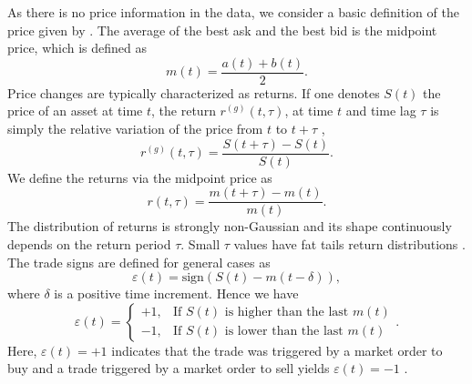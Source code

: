 As there is no price information in the data, we consider a basic definition of
the price given by \cite{forex_liquidity,patterns_forex,political_forex}. The
average of the best ask and the best bid is the midpoint price, which is
defined as
\cite{teach_spread,subtle_nature,Bouchaud_2004,my_paper_response_financial,large_prices_changes,prop_order_book,stat_theory,em_stylized_facts}
\begin{equation}
    m \left(t\right) = \frac{a\left(t\right) + b\left(t\right)}{2}.
\end{equation}
Price changes are typically characterized as returns. If one denotes
$S\left( t\right)$ the price of an asset at time $t$, the return
$r^{\left(g\right)}\left(t, \tau\right)$, at time $t$ and time lag $\tau$ is
simply the relative variation of the price from $t$ to $t + \tau$
\cite{subtle_nature,empirical_facts,asynchrony_effects_corr,tick_size_impact,causes_epps_effect,non_stationarity},
\begin{equation}\label{eq:return_general}
    r^{\left(g\right)} \left(t, \tau \right) = \frac{S\left(t + \tau\right)
    - S\left(t\right)}{S\left(t\right)}.
\end{equation}
We define the returns via the midpoint price as
\begin{equation}\label{eq:midpoint_price_return}
    r\left(t,\tau\right) = \frac{m\left(t+\tau\right)-m\left(t\right)}
    {m\left(t\right)}.
\end{equation}
The distribution of returns is strongly non-Gaussian and its shape continuously
depends on the return period $\tau$. Small $\tau$ values have fat tails return
distributions \cite{subtle_nature}. The trade signs are defined for general
cases as
\begin{equation}\label{eq:trade_sign_general}
    \varepsilon\left(t\right)=\text{sign}\left(S\left(t\right)
    -m\left(t-\delta\right)\right),
\end{equation}
where $\delta$ is a positive time increment. Hence we have
\begin{equation}\label{eq:trade_sign_results}
    \varepsilon\left(t\right)=\left\{
    \begin{array}{cc}
    +1, & \text{If } S\left(t\right)
    \text{ is higher than the last } m\left( t \right)\\
    -1, & \text{If } S\left(t\right)
    \text{ is lower than the last } m\left( t \right)
    \end{array}\right. .
\end{equation}
Here, $\varepsilon(t) = +1$ indicates that the trade was triggered by a market
order to buy and a trade triggered by a market order to sell yields
$\varepsilon(t) = -1$
\cite{subtle_nature,Bouchaud_2004,spread_changes_affect,quant_stock_price_response,order_flow_persistent}.

